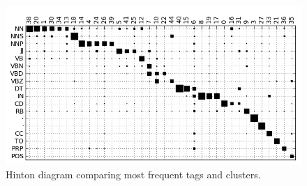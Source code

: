 \begin{figure}[ht] \centering
\includegraphics[width=\textwidth]{hinton.png}
\caption{Hinton diagram comparing most frequent tags and clusters.}
\label{plot-hinton}
\end{figure}

